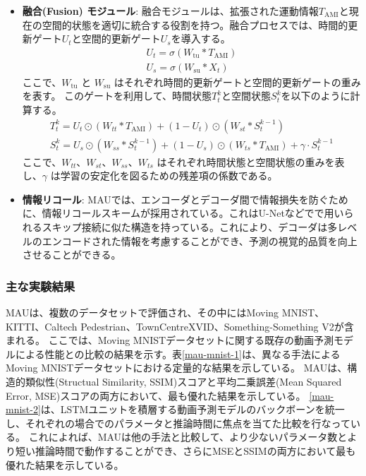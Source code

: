 \begin{itemize}
        \item \textbf{融合(Fusion) モジュール}: 融合モジュールは、拡張された運動情報\(T_{\text{AMI}} \)と現在の空間的状態を適切に統合する役割を持つ。融合プロセスでは、時間的更新ゲート\( U_t \)と空間的更新ゲート\( U_s \)を導入する。
        \begin{align}
          U_t = \sigma(W_{\text{tu}} \ast T_{\text{AMI}}) \\
          U_s = \sigma(W_{\text{su}} \ast X_t) 
        \end{align}
        ここで、\( W_{\text{tu}} \) と \( W_{\text{su}} \) はそれぞれ時間的更新ゲートと空間的更新ゲートの重みを表す。
        このゲートを利用して、時間状態\( T_{t}^{k} \)と空間状態\( S_{t}^{k} \)を以下のように計算する。
        \begin{align}
        T_{t}^{k} = U_t \odot (W_{tt} \ast T_{\text{AMI}}) + (1 - U_t) \odot (W_{st} \ast S_{t}^{k-1}) \\
        S_{t}^{k} = U_s \odot (W_{ss} \ast S_{t}^{k-1}) + (1 - U_s) \odot (W_{ts} \ast T_{\text{AMI}}) + \gamma \cdot S_{t}^{k-1}
        \end{align}
        ここで、\( W_{tt} \)、\( W_{st} \)、\( W_{ss} \)、\( W_{ts} \) はそれぞれ時間状態と空間状態の重みを表し、\( \gamma \) は学習の安定化を図るための残差項の係数である。

        \item \textbf{情報リコール}: 
          MAUでは、エンコーダとデコーダ間で情報損失を防ぐために、情報リコールスキームが採用されている。これはU-Netなどでで用いられるスキップ接続に似た構造を持っている。これにより、デコーダは多レベルのエンコードされた情報を考慮することができ、予測の視覚的品質を向上させることができる。    

       \end{itemize}

      \subsubsection{主な実験結果}
        MAUは、複数のデータセットで評価され、その中にはMoving MNIST、KITTI、Caltech Pedestrian、TownCentreXVID、Something-Something V2が含まれる。
        ここでは、Moving MNISTデータセットに関する既存の動画予測モデルによる性能との比較の結果を示す。表\ref{mau-mnist-1}は、異なる手法によるMoving MNISTデータセットにおける定量的な結果を示している。
        MAUは、構造的類似性(Structual Similarity, SSIM)スコアと平均二乗誤差(Mean Squared Error, MSE)スコアの両方において、最も優れた結果を示している。
        \ref{mau-mnist-2}は、LSTMユニットを積層する動画予測モデルのバックボーンを統一し、それぞれの場合でのパラメータと推論時間に焦点を当てた比較を行なっている。
        これによれば、MAUは他の手法と比較して、より少ないパラメータ数とより短い推論時間で動作することができ、さらにMSEとSSIMの両方において最も優れた結果を示している。

